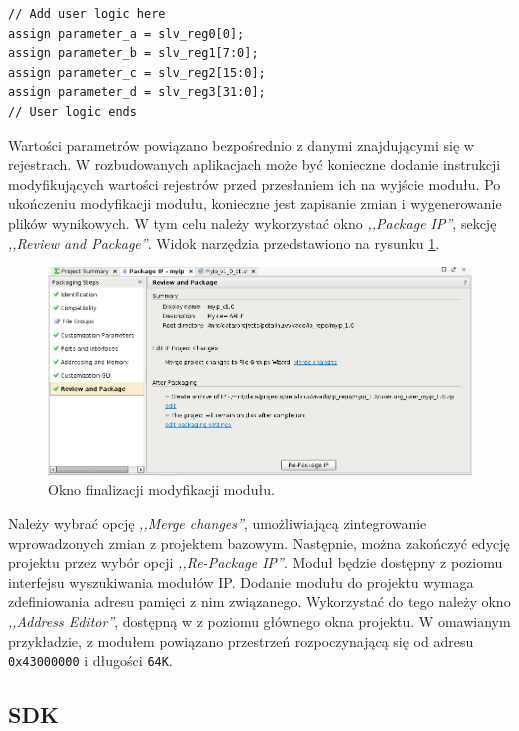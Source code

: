 \begin{lstlisting}[breaklines, label=listing:axi-dma-associate, caption=Powiązanie wyjść z rejestrami modułu.]
// Add user logic here
assign parameter_a = slv_reg0[0];
assign parameter_b = slv_reg1[7:0];
assign parameter_c = slv_reg2[15:0];
assign parameter_d = slv_reg3[31:0];
// User logic ends
\end{lstlisting}

Wartości parametrów powiązano bezpośrednio z danymi znajdującymi się w rejestrach. %
W rozbudowanych aplikacjach może być konieczne dodanie instrukcji modyfikujących wartości rejestrów przed przesłaniem ich na wyjście modułu.
Po ukończeniu modyfikacji modułu, konieczne jest zapisanie zmian i wygenerowanie plików wynikowych. 
W tym celu należy wykorzystać okno \emph{,,Package IP''}, sekcję \emph{,,Review and Package''}. 
Widok narzędzia przedstawiono na rysunku \ref{fig:axi-dma-review-package}.

\begin{figure}[ht]
	\centering
	\includegraphics[width=12cm]{img/vivado/axi-dma-review-package.png}
	\caption{Okno finalizacji modyfikacji modułu.}
	\label{fig:axi-dma-review-package}
\end{figure}

Należy wybrać opcję \emph{,,Merge changes''}, umożliwiającą zintegrowanie wprowadzonych zmian z projektem bazowym. 
Następnie, można zakończyć edycję projektu przez wybór opcji \emph{,,Re-Package IP''}. 
Moduł będzie dostępny z poziomu interfejsu wyszukiwania modułów IP.
Dodanie modułu do projektu wymaga zdefiniowania adresu pamięci z nim związanego. Wykorzystać do tego należy okno \emph{,,Address Editor''}, dostępną w z poziomu głównego okna projektu. W omawianym przykładzie, z modułem powiązano przestrzeń rozpoczynającą się od adresu \texttt{0x43000000} i długości \texttt{64K}.
\subsection{SDK}
\label{sec:vivado-axi-dma-sdk}

